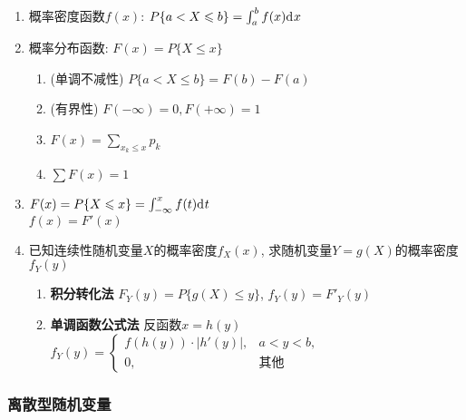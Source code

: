 \begin{enumerate}
\item 概率密度函数$f(x)$: $P\{a<X\leqslant b\}=\int_a^b f(x){\mathrm{d}\:\!} x$
\item 概率分布函数: $F(x)=P\{X\le x\}$
\begin{enumerate}
\item (单调不减性) $P\{a<X\le b\}=F(b)-F(a)$
\item (有界性) $F(-\infty)=0, F(+\infty)=1$
\item $F(x)=\sum_{x_k\le x}p_k$
\item $\sum F(x)=1$
\end{enumerate}
\item $F(x)=P\{X\leqslant x\}=\int_{-\infty}^{x}f(t){\mathrm{d}\:\!} t$\\$f(x)=F'(x)$

\item 已知连续性随机变量$X$的概率密度$f_X(x)$, 求随机变量$Y=g(X)$的概率密度$f_Y(y)$
\begin{enumerate}
\item {\bf 积分转化法} $F_Y(y)=P\{g(X)\le y\}$, $f_Y(y)=F'_Y(y)$
\item {\bf 单调函数公式法} 反函数$x=h(y)$ \\
$f_Y(y)=\left\{\begin{array}{cl}
f(h(y))\cdot|h'(y)|, & a< y< b,\\
0, & \text{其他}
\end{array}\right.$
\end{enumerate}

\end{enumerate}

\subsubsection*{离散型随机变量}

